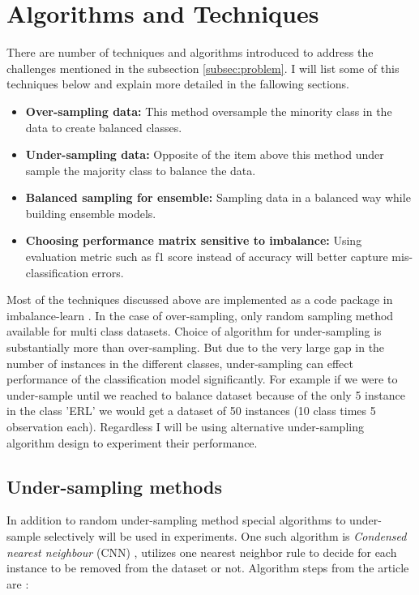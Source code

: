 \documentclass[12pt]{article}
\begin{document}
\section{Algorithms and Techniques} \label{sec:algo}

There are number of techniques and algorithms introduced to address the challenges mentioned in the subsection \ref{subsec:problem}. I will list some of this techniques below and explain more detailed in the fallowing sections.

\begin{itemize}
    \item \textbf{Over-sampling data: }This method oversample the minority class in the data to create balanced classes.
    \item \textbf{Under-sampling data: }Opposite of the item above this method under sample the majority class to balance the data.
    \item \textbf{Balanced sampling for ensemble: }Sampling data in a balanced way while building ensemble models.
    \item \textbf{Choosing performance matrix sensitive to imbalance: }Using evaluation metric such as f1 score instead of accuracy will better capture mis-classification errors.
\end{itemize}

Most of the techniques discussed above are implemented as a code package in imbalance-learn \cite{imbalancelearn}. In the case of over-sampling, only random sampling method available for multi class datasets. Choice of algorithm for under-sampling is substantially more than over-sampling. But due to the very large gap in the number of instances in the different classes, under-sampling can effect performance of the classification model significantly. For example if we were to under-sample until we reached to balance dataset because of the only 5 instance in the class 'ERL' we would get a dataset of 50 instances (10 class times 5 observation each). Regardless I will be using alternative under-sampling algorithm design to experiment their performance. 

\subsection{Under-sampling methods} \label{subsec:undersample}

In addition to random under-sampling method special algorithms to under-sample selectively will be used in experiments. One such algorithm is \textit{Condensed nearest neighbour} (CNN) \cite{condense}, utilizes one nearest neighbor rule to decide for each instance to be removed from the dataset or not. Algorithm steps from the article are \cite{condense}:
\end{document}
